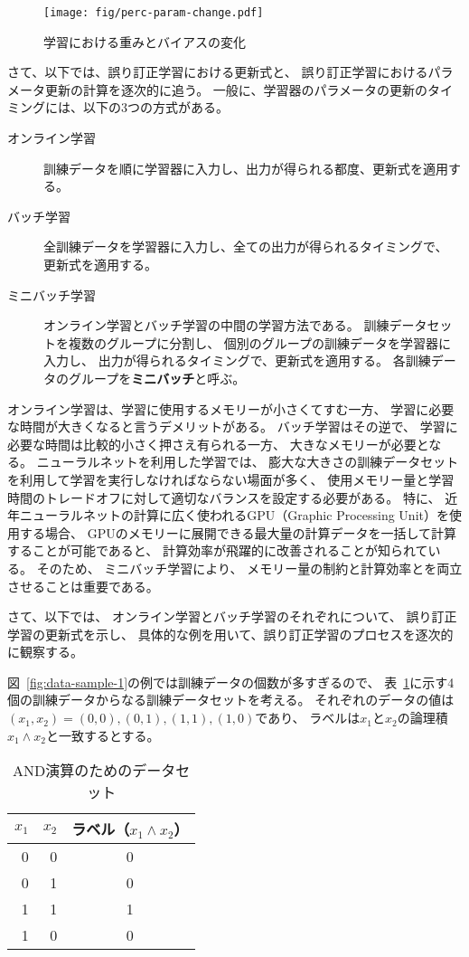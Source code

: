 \begin{figure}
  \centering
  \texttt{[image: fig/perc-param-change.pdf]}
  
  \caption{学習における重みとバイアスの変化}
  \label{fig:change-parameters}
\end{figure}

さて、以下では、誤り訂正学習における更新式と、
誤り訂正学習におけるパラメータ更新の計算を逐次的に追う。
一般に、学習器のパラメータの更新のタイミングには、以下の3つの方式がある。

\begin{description}
\item[オンライン学習]
  訓練データを順に学習器に入力し、出力が得られる都度、更新式を適用する。
\item[バッチ学習]
  全訓練データを学習器に入力し、全ての出力が得られるタイミングで、
  更新式を適用する。
\item[ミニバッチ学習]
  オンライン学習とバッチ学習の中間の学習方法である。
  訓練データセットを複数のグループに分割し、
  個別のグループの訓練データを学習器に入力し、
  出力が得られるタイミングで、更新式を適用する。
  各訓練データのグループを\textbf{ミニバッチ}と呼ぶ。
\end{description}

オンライン学習は、学習に使用するメモリーが小さくてすむ一方、
学習に必要な時間が大きくなると言うデメリットがある。
バッチ学習はその逆で、
学習に必要な時間は比較的小さく押さえ有られる一方、
大きなメモリーが必要となる。
ニューラルネットを利用した学習では、
膨大な大きさの訓練データセットを利用して学習を実行しなければならない場面が多く、
使用メモリー量と学習時間のトレードオフに対して適切なバランスを設定する必要がある。
特に、
近年ニューラルネットの計算に広く使われるGPU（Graphic Processing Unit）を使用する場合、
GPUのメモリーに展開できる最大量の計算データを一括して計算することが可能であると、
計算効率が飛躍的に改善されることが知られている。
そのため、
ミニバッチ学習により、
メモリー量の制約と計算効率とを両立させることは重要である。

さて、以下では、
オンライン学習とバッチ学習のそれぞれについて、
誤り訂正学習の更新式を示し、
具体的な例を用いて、誤り訂正学習のプロセスを逐次的に観察する。

図~\ref{fig:data-sample-1}の例では訓練データの個数が多すぎるので、
表~\ref{tab:and}に示す4個の訓練データからなる訓練データセットを考える。
それぞれのデータの値は$(x_1, x_2) = (0, 0), (0, 1), (1, 1), (1, 0)$であり、
ラベルは$x_1$と$x_2$の論理積$x_1\land x_2$と一致するとする。
\begin{table}
  \centering
  \caption{AND演算のためのデータセット}
  \label{tab:and}
  \begin{tabular}{rrc}
    \toprule
    $x_1$ & $x_2$ & ラベル（$x_1\land x_2$）\\
    \midrule
    0 & 0 & 0\\
    0 & 1 & 0\\
    1 & 1 & 1\\
    1 & 0 & 0\\
    \bottomrule       
  \end{tabular}
\end{table}

